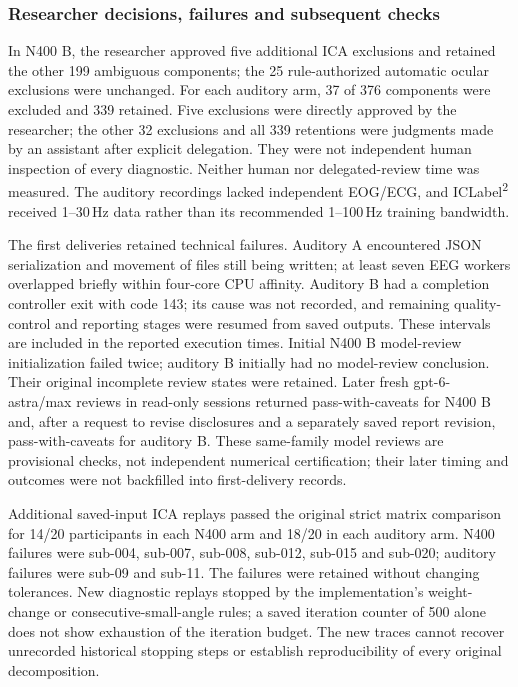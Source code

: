 \subsubsection*{Researcher decisions, failures and subsequent checks}

In N400 B, the researcher approved five additional ICA exclusions and retained the other 199 ambiguous components; the 25 rule-authorized automatic ocular exclusions were unchanged. For each auditory arm, 37 of 376 components were excluded and 339 retained. Five exclusions were directly approved by the researcher; the other 32 exclusions and all 339 retentions were judgments made by an assistant after explicit delegation. They were not independent human inspection of every diagnostic. Neither human nor delegated-review time was measured. The auditory recordings lacked independent EOG/ECG, and ICLabel\textsuperscript{2} received 1--30\,Hz data rather than its recommended 1--100\,Hz training bandwidth.

The first deliveries retained technical failures. Auditory A encountered JSON serialization and movement of files still being written; at least seven EEG workers overlapped briefly within four-core CPU affinity. Auditory B had a completion controller exit with code 143; its cause was not recorded, and remaining quality-control and reporting stages were resumed from saved outputs. These intervals are included in the reported execution times. Initial N400 B model-review initialization failed twice; auditory B initially had no model-review conclusion. Their original incomplete review states were retained. Later fresh gpt-6-astra/max reviews in read-only sessions returned pass-with-caveats for N400 B and, after a request to revise disclosures and a separately saved report revision, pass-with-caveats for auditory B. These same-family model reviews are provisional checks, not independent numerical certification; their later timing and outcomes were not backfilled into first-delivery records.

Additional saved-input ICA replays passed the original strict matrix comparison for 14/20 participants in each N400 arm and 18/20 in each auditory arm. N400 failures were sub-004, sub-007, sub-008, sub-012, sub-015 and sub-020; auditory failures were sub-09 and sub-11. The failures were retained without changing tolerances. New diagnostic replays stopped by the implementation's weight-change or consecutive-small-angle rules; a saved iteration counter of 500 alone does not show exhaustion of the iteration budget. The new traces cannot recover unrecorded historical stopping steps or establish reproducibility of every original decomposition.

